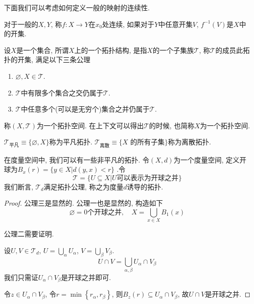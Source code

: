下面我们可以考虑如何定义一般的映射的连续性.
\begin{definition}
    对于一般的$X, Y$, 称$f\colon X \to Y$在$x_0$处连续, 如果对于$Y$中任意开集$V$, $f^{-1} \left( V \right) $是$X$中的开集.
\end{definition}

\begin{definition}
    设$X$是一个集合, 所谓$X$上的一个拓扑结构, 是指$X$的一个子集族$\mathscr{T}$, 称$\mathscr{T}$的成员此拓扑的开集, 满足以下三条公理
    \begin{enumerate}
        \item $\varnothing, X \in \mathscr{T}$.
        \item $\mathscr{T}$中有限多个集合之交仍属于$\mathscr{T}$.
        \item $\mathscr{T}$中任意多个(可以是无穷个)集合之并仍属于$\mathscr{T}$.
    \end{enumerate}
    称$\left( X , \mathscr{T}\right) $为一个拓扑空间. 在上下文可以得出$\mathscr{T}$的时候, 也简称$X$为一个拓扑空间.
\end{definition}

\begin{example}
    $\mathscr{T}_{\text{平凡}} \equiv \{ \varnothing, X \}$称为平凡拓扑.
    $\mathscr{T}_{\text{离散}} \equiv \{ X \text{ 的所有子集} \} $称为离散拓扑.
\end{example}

在度量空间中, 我们可以有一些非平凡的拓扑. 令$\left( X, d \right) $为一个度量空间, 定义开球为$B_{x}\left( r \right)  = \{ y \in X | d\left( y,x \right) < r \}$ .令
\begin{equation}
    \mathscr{T} = \{ U \subseteq X | U \text{可以表示为开球之并} \}
\end{equation}
我们断言, $\mathscr{T}_{d}$满足拓扑公理, 称之为度量$d$诱导的拓扑.
\begin{proof}
    公理三是显然的. 公理一也是显然的, 构造如下
    \begin{equation}
      \varnothing = \text{0个开球之并},\quad X = \bigcup_{x \in X} B_{1}\left( x \right)
    \end{equation}

    公理二需要证明.

    设$U,V \in \mathscr{T}_{d}$, $U = \bigcup_{\alpha} U_{\alpha}$, $V = \bigcup_{\beta} V_{\beta}$. 
    \begin{equation}
        U \cap V = \bigcup_{\alpha, \beta} U_{\alpha} \cap V_{\beta} 
    \end{equation}
    我们只需证$U_{\alpha} \cap V_{\beta}$是开球之并即可. 
    
    令$z \in U_{\alpha} \cap V_{\beta}$, 令$r = \min \left\{ r_{\alpha}, r_{\beta} \right\} $, 则$B_{z}\left( r \right) \subseteq U_{\alpha} \cap V_{\beta} $, 故$U \cap V$是开球之并.
\end{proof}